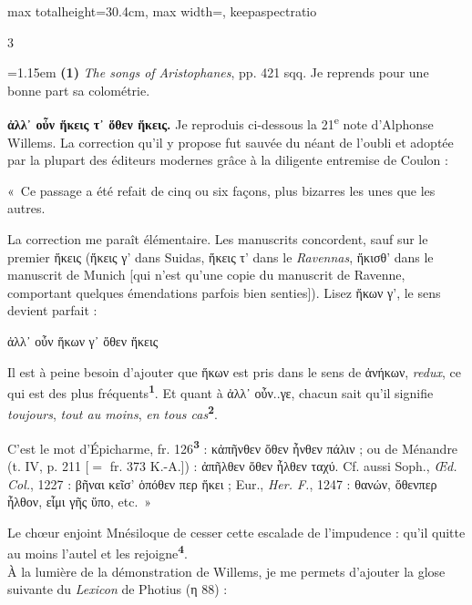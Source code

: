 \documentclass[11pt,twoside]{book}
\newcommand{\italique}[1]{\textit{#1}}
\newcommand{\citComm}[1]{\begin{quoting}[vskip=0.4pt,leftmargin=0.7em,rightmargin=0.2em]#1\end{quoting}}
\newcommand{\nieme}[1]{#1\textsuperscript{e}}
\newcommand{\latin}[1]{\textit{#1}}
\newcommand{\marqueur}[1]{\textsuperscript{\color{rubricRed}\textbf{#1}}}
\begin{document}
\begin{adjustbox}{max totalheight=30.4cm, max width=\textwidth, keepaspectratio}
\begin{minipage}{\textwidth}
{\begin{multicols}{3}
\par\vspace{1.5pt}
\par\vspace{1.2pt}\par\nopagebreak\vspace{1pt}\noindent\hangindent=1.15em {\color{sepiaNote}\textbf{(1)}} \italique{The songs of Aristophanes}, pp. 421 sqq. Je reprends pour une bonne part sa colométrie.
\par\vspace{1.5pt}
 \textbf{ἀλλ᾽ οὖν ἥκεις τ᾿ ὅθεν ἥκεις.} Je reproduis ci-dessous la \nieme{21} note d'Alphonse Willems. La correction qu'il y propose fut sauvée du néant de l'oubli et adoptée par la plupart des éditeurs modernes grâce à la diligente entremise de Coulon :
\par\vspace{1.5pt}
\noindent «~Ce passage a été refait de cinq ou six façons, plus bizarres les unes que les autres.
\par\vspace{1.5pt}
\noindent La correction me paraît élémentaire. Les manuscrits concordent, sauf sur le premier ἥκεις (ἥκεις γ' dans Suidas, ἥκεις τ' dans le \italique{Ravennas}, ἥκισθ' dans le manuscrit de Munich [qui n'est qu'une copie du manuscrit de Ravenne, comportant quelques émendations parfois bien senties]). Lisez ἥκων γ', le sens devient parfait :
\citComm{ἀλλ᾽ οὖν ἥκων γ᾽ ὅθεν ἥκεις}
\par\vspace{1.5pt}
\noindent Il est à peine besoin d'ajouter que ἥκων est pris dans le sens de ἀνήκων, \italique{redux}, ce qui est des plus fréquents\marqueur{1}. Et quant à ἀλλ᾽ οὖν..γε, chacun sait qu'il signifie \italique{toujours}, \italique{tout au moins}, \italique{en tous cas}\marqueur{2}.\\
\par\vspace{1.5pt}
\noindent C'est le mot d'Épicharme, fr. 126\marqueur{3} : κἀπῆνθεν ὅθεν ἦνθεν πάλιν ; ou de Ménandre (t. IV, p. 211 [$=$ fr. 373 K.-A.]) : ἀπῆλθεν ὅθεν ἦλθεν ταχύ. Cf. aussi Soph., \italique{Œd. Col.}, 1227 : βῆναι κεῖσ' ὁπόθεν περ ἥκει ; Eur., \italique{Her. F.}, 1247 : θανών, ὅθενπερ ἦλθον, εἶμι γῆς ὕπο, etc.~»
\par\vspace{1.5pt}
\noindent Le chœur enjoint Mnésiloque de cesser cette escalade de l'impudence : qu'il quitte au moins l'autel et les rejoigne\marqueur{4}.\\ À la lumière de la démonstration de Willems, je me permets d'ajouter la glose suivante du \latin{Lexicon} de Photius (η 88) :

\end{multicols}}
\end{minipage}
\end{adjustbox}
\end{document}
